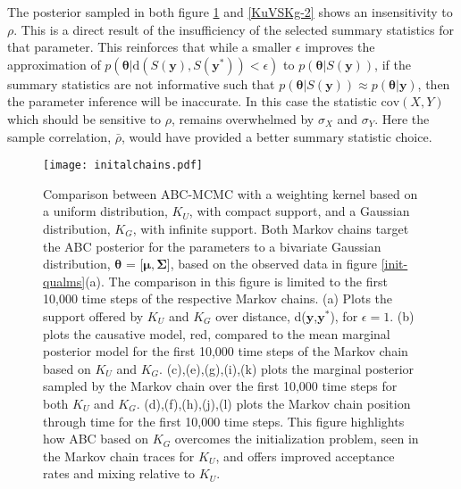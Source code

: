 The posterior sampled in both figure \ref{KuVSKg-1} and \ref{KuVSKg-2} shows an insensitivity to $\rho$. This is a direct result of the insufficiency of the selected summary statistics for that parameter. This reinforces that while a smaller $\epsilon$ improves the approximation of  $p(\bm{\theta}|\text{d}(S(\bm{y}),S(\bm{y^*}))<\epsilon)$ to $ p(\bm{\theta}|S(\bm{y}))$, if the summary statistics are not informative such that $p(\bm{\theta}|S(\bm{y})) \approx p(\bm{\theta}|\bm{y})$, then the parameter inference will be inaccurate. In this case the statistic $\text{cov}(X,Y)$ which should be sensitive to $\rho$, remains overwhelmed by $\sigma_X$ and $\sigma_Y$. Here the sample correlation, $\bar{\rho}$, would have provided a better summary statistic choice. 

\begin{figure}[H]
	\centering
	\texttt{[image: initalchains.pdf]}
	\caption{Comparison between ABC-MCMC with a weighting kernel based on a uniform distribution, $K_U$, with compact support, and a Gaussian distribution, $K_G$, with infinite support. Both Markov chains target the ABC posterior for the parameters to a bivariate Gaussian distribution, $\bm{\theta}$ = [$\bm{\mu}, \bm{\Sigma}$], based on the observed data in figure \ref{init-qualms}(a). The comparison in this figure is limited to the first 10,000 time steps of the respective Markov chains. (a) Plots the support offered by $K_U$ and $K_G$ over distance, d($\bm{y}$,$\bm{y^*}$), for $\epsilon=1$. (b) plots the causative model, red, compared to the mean marginal posterior model for the first 10,000 time steps of the Markov chain based on $K_U$ and $K_G$. (c),(e),(g),(i),(k) plots the marginal posterior sampled by the Markov chain over the first 10,000 time steps for both $K_U$ and $K_G$. (d),(f),(h),(j),(l) plots the Markov chain position through time for the first 10,000 time steps. This figure highlights how ABC based on $K_G$ overcomes the initialization problem, seen in the Markov chain traces for $K_U$, and offers improved acceptance rates and mixing relative to $K_U$.}
	\label{KuVSKg-1}
\end{figure}


